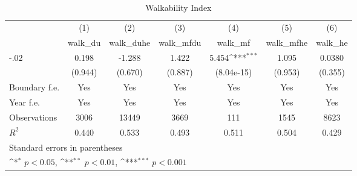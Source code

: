 \begin{table}[htbp]\centering
\def\sym#1{\ifmmode^{#1}\else\(^{#1}\)\fi}
\caption{Walkability Index}
\begin{tabular}{l*{6}{c}}
\hline\hline
                    &\multicolumn{1}{c}{(1)}&\multicolumn{1}{c}{(2)}&\multicolumn{1}{c}{(3)}&\multicolumn{1}{c}{(4)}&\multicolumn{1}{c}{(5)}&\multicolumn{1}{c}{(6)}\\
                    &\multicolumn{1}{c}{walk\_du}&\multicolumn{1}{c}{walk\_duhe}&\multicolumn{1}{c}{walk\_mfdu}&\multicolumn{1}{c}{walk\_mf}&\multicolumn{1}{c}{walk\_mfhe}&\multicolumn{1}{c}{walk\_he}\\
\hline
-.02                &       0.198         &      -1.288         &       1.422         &       5.454\sym{***}&       1.095         &      0.0380         \\
                    &     (0.944)         &     (0.670)         &     (0.887)         &  (8.04e-15)         &     (0.953)         &     (0.355)         \\
[1em]
Boundary f.e.       &         Yes         &         Yes         &         Yes         &         Yes         &         Yes         &         Yes         \\
[1em]
Year f.e.           &         Yes         &         Yes         &         Yes         &         Yes         &         Yes         &         Yes         \\
\hline
Observations        &        3006         &       13449         &        3669         &         111         &        1545         &        8623         \\
\(R^{2}\)           &       0.440         &       0.533         &       0.493         &       0.511         &       0.504         &       0.429         \\
\hline\hline
\multicolumn{7}{l}{\footnotesize Standard errors in parentheses}\\
\multicolumn{7}{l}{\footnotesize \sym{*} \(p<0.05\), \sym{**} \(p<0.01\), \sym{***} \(p<0.001\)}\\
\end{tabular}
\end{table}

